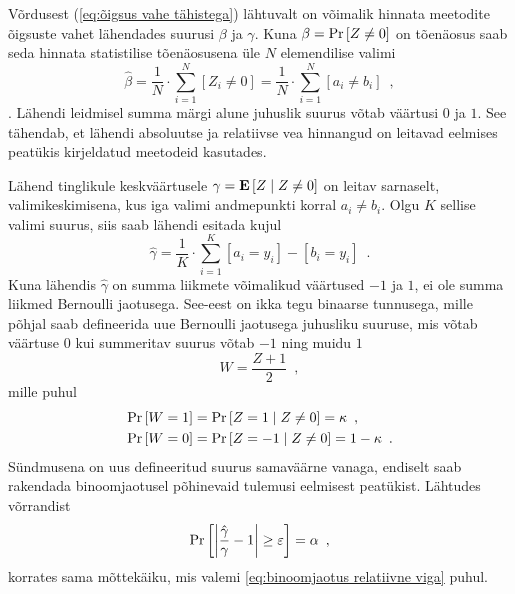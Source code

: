 Võrdusest (\ref{eq:õigsus vahe tähistega}) lähtuvalt on võimalik hinnata meetodite õigsuste vahet lähendades suurusi $\beta$ ja $\gamma$. Kuna $\beta = \Pr\left[Z \neq 0\right]$ on tõenäosus saab seda hinnata statistilise tõenäosusena üle $N$ elemendilise valimi 
\begin{equation}
    \label{eq:beta lähend}
    \hat{\beta}=\frac{1}{N}\cdot\sum_{i=1}^{N}[Z_i\neq0]=\frac{1}{N}\cdot\sum_{i=1}^{N}[a_i\neq b_i] \enspace,
\end{equation}
\cite{rakendusstatisika-algkursus}.
Lähendi leidmisel summa märgi alune juhuslik suurus võtab väärtusi $0$ ja $1$. See tähendab, et lähendi absoluutse ja relatiivse vea hinnangud on leitavad eelmises peatükis kirjeldatud meetodeid kasutades.

Lähend tinglikule keskväärtusele $\gamma=\operatorname*{\mathbf{E}}\left[Z\mid Z\neq 0\right]$ on leitav sarnaselt, valimikeskimisena, kus iga valimi andmepunkti korral $a_i \neq b_i$.
Olgu $K$ sellise valimi suurus, siis saab lähendi esitada kujul
\begin{equation}
    \label{eq:gamma lähend}
    \hat{\gamma}=\frac{1}{K}\cdot\sum_{i=1}^K [a_i=y_i]-[b_i=y_i] \enspace.
\end{equation}
Kuna lähendis $\hat{\gamma}$ on summa liikmete võimalikud väärtused $-1$ ja $1$, ei ole summa liikmed Bernoulli jaotusega. See-eest on ikka tegu binaarse tunnusega, mille põhjal saab defineerida uue Bernoulli jaotusega juhusliku suuruse, mis võtab väärtuse $0$ kui summeritav suurus võtab $-1$ ning muidu $1$
\begin{equation*}
    W = \frac{Z + 1}{2} \enspace,
\end{equation*}
mille puhul
\begin{align*}
    \Pr\left[W=1\right]&=\Pr\left[Z=1 \mid Z\neq 0\right]=\kappa \enspace, \\
    \Pr\left[W=0\right]&=\Pr\left[Z=-1 \mid Z\neq 0\right]=1-\kappa \enspace.
\end{align*}
Sündmusena on uus defineeritud suurus samaväärne vanaga, endiselt saab rakendada binoomjaotusel põhinevaid tulemusi eelmisest peatükist. Lähtudes võrrandist
\begin{equation*}
    \Pr\left[\left| \frac{\hat{\gamma}}{\gamma} - 1 \right| \geq \varepsilon\right] = \alpha \enspace,
\end{equation*}
korrates sama mõttekäiku, mis valemi \eqref{eq:binoomjaotus relatiivne viga} puhul.

